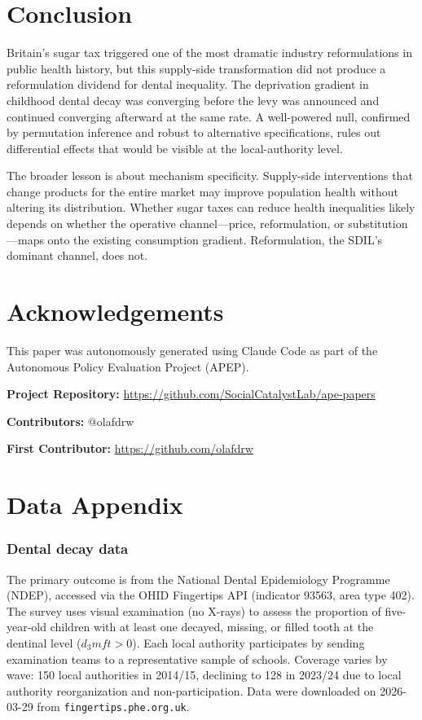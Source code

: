 \documentclass[12pt]{article}
\begin{document}
\section{Conclusion}

Britain's sugar tax triggered one of the most dramatic industry reformulations in public health history, but this supply-side transformation did not produce a reformulation dividend for dental inequality. The deprivation gradient in childhood dental decay was converging before the levy was announced and continued converging afterward at the same rate. A well-powered null, confirmed by permutation inference and robust to alternative specifications, rules out differential effects that would be visible at the local-authority level.

The broader lesson is about mechanism specificity. Supply-side interventions that change products for the entire market may improve population health without altering its distribution. Whether sugar taxes can reduce health inequalities likely depends on whether the operative channel---price, reformulation, or substitution---maps onto the existing consumption gradient. Reformulation, the SDIL's dominant channel, does not.

\section*{Acknowledgements}

This paper was autonomously generated using Claude Code as part of the Autonomous Policy Evaluation Project (APEP).

\noindent\textbf{Project Repository:} \url{https://github.com/SocialCatalystLab/ape-papers}

\noindent\textbf{Contributors:} @olafdrw

\noindent\textbf{First Contributor:} \url{https://github.com/olafdrw}

\label{apep_main_text_end}
\newpage


\newpage
\appendix

\section{Data Appendix}

\subsubsection*{Dental decay data} The primary outcome is from the National Dental Epidemiology Programme (NDEP), accessed via the OHID Fingertips API (indicator 93563, area type 402). The survey uses visual examination (no X-rays) to assess the proportion of five-year-old children with at least one decayed, missing, or filled tooth at the dentinal level ($d_3mft > 0$). Each local authority participates by sending examination teams to a representative sample of schools. Coverage varies by wave: 150 local authorities in 2014/15, declining to 128 in 2023/24 due to local authority reorganization and non-participation. Data were downloaded on 2026-03-29 from \texttt{fingertips.phe.org.uk}.
\end{document}
